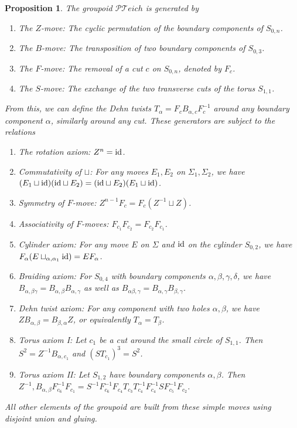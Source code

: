 \documentclass[11pt]{report}
\newtheorem{prop}[theorem]{Proposition}
\theoremstyle{definition}
\theoremstyle{remark}
\theoremstyle{remark}
\newcommand{\id}{\textnormal{id}}
\begin{document}
\begin{prop}
The groupoid $\mathcal{PT}eich$ is generated by
\begin{enumerate}[label=(\roman*)]
\item The $Z$-move: The cyclic permutation of the boundary components of $S_{0,n}$.
\item The $B$-move: The transposition of two boundary components of $S_{0,3}$.
\item The $F$-move: The removal of a cut $c$ on $S_{0,n}$, denoted by $F_c$.
\item The $S$-move: The exchange of the two transverse cuts of the torus $S_{1,1}$.
\end{enumerate}
From this, we can define the Dehn twists $T_\alpha = F_c B_{\alpha,c} F_c^{-1}$ around any boundary component $\alpha$, similarly around any cut. These generators are subject to the relations
\begin{enumerate}[label=(\roman*)]
\item The rotation axiom: $Z^n = \id$.
\item Commutativity of $\sqcup$: For any moves $E_1,E_2$ on $\Sigma_1,\Sigma_2$, we have $(E_1 \sqcup \id) (\id \sqcup E_2) = (\id \sqcup E_2) (E_1 \sqcup \id)$.
\item Symmetry of $F$-move: $Z^{n-1} F_c = F_c (Z^{-1} \sqcup Z)$.
\item Associativity of $F$-moves: $F_{c_1} F_{c_2} = F_{c_2} F_{c_1}$.
\item Cylinder axiom: For any move $E$ on $\Sigma$ and $\id$ on the cylinder $S_{0,2}$, we have $F_\alpha (E \sqcup_{\alpha,\alpha_1} \id) = E F_\alpha$.
\item Braiding axiom: For $S_{0,4}$ with boundary components $\alpha,\beta,\gamma,\delta$, we have $B_{\alpha,\beta \gamma} = B_{\alpha,\beta} B_{\alpha,\gamma}$ as well as $B_{\alpha \beta,\gamma} = B_{\alpha,\gamma} B_{\beta,\gamma}$.
\item Dehn twist axiom: For any component with two holes $\alpha,\beta$, we have $Z B_{\alpha,\beta} = B_{\beta, \alpha} Z$, or equivalently $T_\alpha = T_\beta$.
\item Torus axiom I: Let $c_1$ be a cut around the small circle of $S_{1,1}$. Then $S^2 = Z^{-1} B_{\alpha,c_1}$ and $(ST_{c_1})^3 = S^2$.
\item Torus axiom II: Let $S_{1,2}$ have boundary components $\alpha,\beta$. Then $Z^{-1},B_{\alpha,\beta} F_{c_6}^{-1} F_{c_1} = S^{-1} F_{c_6}^{-1} F_{c_4} T_{c_3} T_{c_4}^{-1} F_{c_4}^{-1} S F_{c_5}^{-1} F_{c_2}$.
\end{enumerate}
All other elements of the groupoid are built from these simple moves using disjoint union and gluing.
\end{prop}
\end{document}

